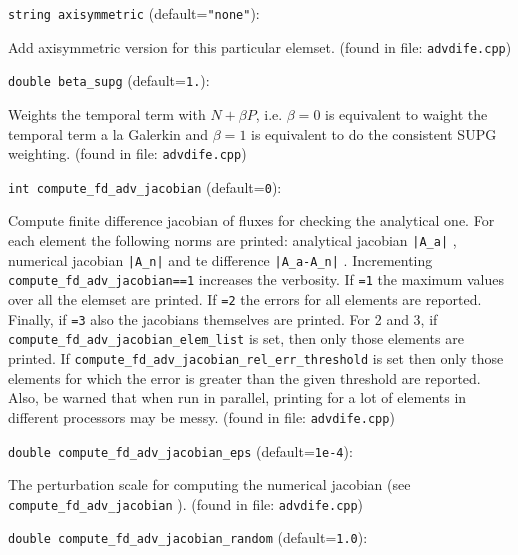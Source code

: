 \item\verb+string axisymmetric+ {\rm(default=\verb|"none"|)}:

Add axisymmetric version for this particular elemset.
 (found in file: \verb+advdife.cpp+)
\item\verb+double beta_supg+ {\rm(default=\verb|1.|)}:

Weights the temporal term with $N+\beta P$, i.e.
$\beta=0$ is equivalent to waight the temporal term a la
Galerkin and $\beta=1$ is equivalent to do the consistent SUPG weighting.
 (found in file: \verb+advdife.cpp+)
\item\verb+int compute_fd_adv_jacobian+ {\rm(default=\verb|0|)}:

Compute finite difference jacobian of fluxes for checking the
 analytical one. For each element the following norms are printed:
 analytical jacobian \verb+|A_a|+ , numerical jacobian \verb+|A_n|+ and te
 difference \verb+|A_a-A_n|+ . Incrementing \verb+compute_fd_adv_jacobian==1+
 increases the verbosity. If \verb+=1+ the maximum values over all the
 elemset are printed. If \verb+=2+ the errors for all elements are
 reported. Finally, if \verb+=3+ also the jacobians themselves are
 printed. For 2 and 3, if \verb+compute_fd_adv_jacobian_elem_list+ is
 set, then only those elements are printed. If
 \verb+compute_fd_adv_jacobian_rel_err_threshold+ is set then only those
 elements for which the error is greater than the given threshold
 are reported.  Also, be warned that when run in parallel, printing
 for a lot of elements in different processors may be messy.
 (found in file: \verb+advdife.cpp+)
\item\verb+double compute_fd_adv_jacobian_eps+ {\rm(default=\verb|1e-4|)}:

The perturbation scale for computing the numerical jacobian
 (see \verb+compute_fd_adv_jacobian+ ).
 (found in file: \verb+advdife.cpp+)
\item\verb+double compute_fd_adv_jacobian_random+ {\rm(default=\verb|1.0|)}:

